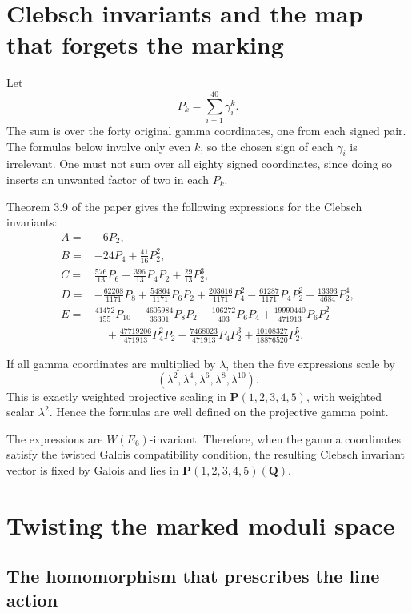 \documentclass[11pt]{article}
\newcommand{\QQ}{\mathbf{Q}}
\newcommand{\PP}{\mathbf{P}}
\begin{document}
\section{Clebsch invariants and the map that forgets the marking}

Let
\[
  P_k=\sum_{i=1}^{40}\gamma_i^k.
\]
The sum is over the forty original gamma coordinates, one from each signed
pair.  The formulas below involve only even $k$, so the chosen sign of each
$\gamma_i$ is irrelevant.  One must not sum over all eighty signed
coordinates, since doing so inserts an unwanted factor of two in each
$P_k$.

Theorem 3.9 of the paper gives the following expressions for the Clebsch
invariants:
\[
\begin{aligned}
 A={}&-6P_2,\\
 B={}&-24P_4+\frac{41}{16}P_2^2,\\
 C={}&\frac{576}{13}P_6-\frac{396}{13}P_4P_2
       +\frac{29}{13}P_2^3,\\
 D={}&-\frac{62208}{1171}P_8
       +\frac{54864}{1171}P_6P_2
       +\frac{203616}{1171}P_4^2
       -\frac{61287}{1171}P_4P_2^2
       +\frac{13393}{4684}P_2^4,\\
 E={}&\frac{41472}{155}P_{10}
       -\frac{4605984}{36301}P_8P_2
       -\frac{106272}{403}P_6P_4
       +\frac{19990440}{471913}P_6P_2^2\\
   &\quad
       +\frac{47719206}{471913}P_4^2P_2
       -\frac{7468023}{471913}P_4P_2^3
       +\frac{10108327}{18876520}P_2^5.
\end{aligned}
\]

If all gamma coordinates are multiplied by $\lambda$, then the five
expressions scale by
\[
  (\lambda^2,\lambda^4,\lambda^6,\lambda^8,\lambda^{10}).
\]
This is exactly weighted projective scaling in $\PP(1,2,3,4,5)$, with
weighted scalar $\lambda^2$.  Hence the formulas are well defined on the
projective gamma point.

The expressions are $W(E_6)$-invariant.  Therefore, when the gamma
coordinates satisfy the twisted Galois compatibility condition, the resulting
Clebsch invariant vector is fixed by Galois and lies in
$\PP(1,2,3,4,5)(\QQ)$.

\section{Twisting the marked moduli space}

\subsection{The homomorphism that prescribes the line action}
\end{document}
